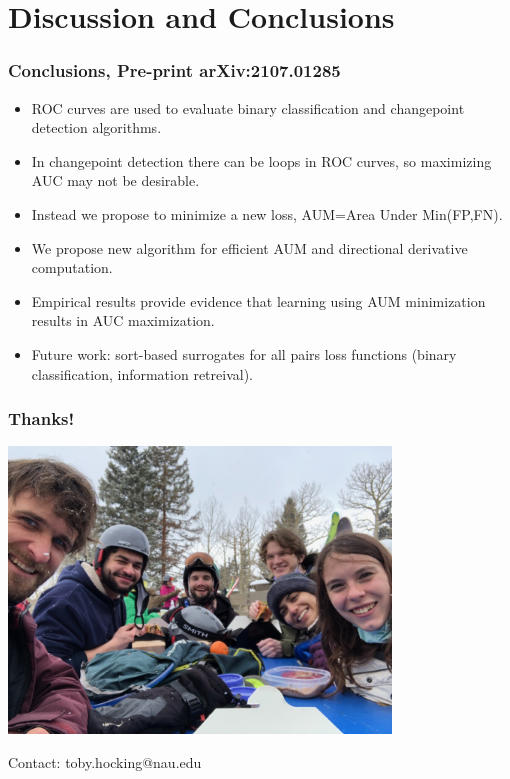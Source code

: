 \documentclass{beamer}
\begin{document}
\section{Discussion and Conclusions}

\begin{frame}
  \frametitle{Conclusions, Pre-print arXiv:2107.01285}
  \begin{itemize}
  \item ROC curves are used to evaluate binary classification and
    changepoint detection algorithms.
  \item In changepoint detection there can be loops in ROC curves, so
    maximizing AUC may not be desirable.
  \item Instead we propose to minimize a new loss, AUM=Area
    Under Min(FP,FN).
  \item We propose new algorithm for efficient AUM and directional
    derivative computation.
  \item Empirical results provide evidence that learning using AUM
    minimization results in AUC maximization.
  \item Future work: sort-based surrogates for all pairs loss
    functions (binary classification, information retreival).
  \end{itemize}
\end{frame}

\begin{frame}
  \frametitle{Thanks!}

  \includegraphics[height=3in]{2021-03-lab-ski-lunch} 

  Contact: toby.hocking@nau.edu

\end{frame}
\end{document}
